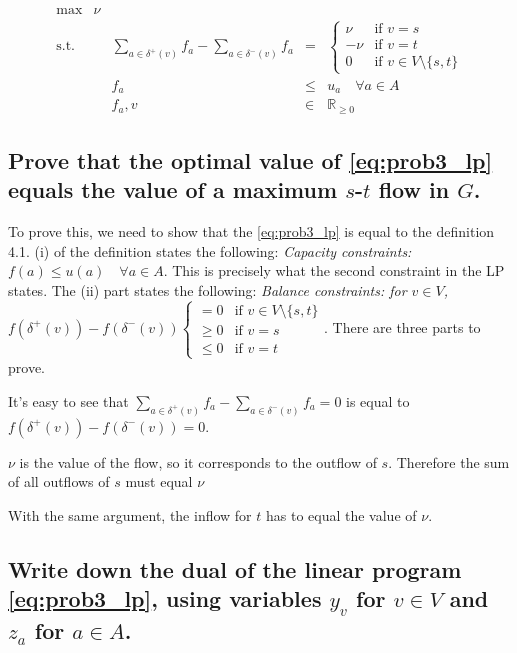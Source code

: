 \documentclass[12pt, a4]{article}
\begin{document}
\begin{equation}
	\begin{array}{llrcl}
		\max & \nu \\
		\text{s.t.} && \sum_{a\in\delta^+(v)}f_a - \sum_{a\in\delta^-(v)}f_a & = & \begin{cases}
			\nu &\text{if } v=s \\
			-\nu & \text{if } v=t \\
			0 & \text{if } v\in V \setminus \{s,t\}
			\end{cases} \\
		&& f_a & \leq & u_a \quad \forall a \in A \\
		&& f_a, v & \in & \mathbb{R}_{\geq 0}
	\end{array}
\label{eq:prob3_lp}
\end{equation}
\subsection{Prove that the optimal value of \autoref{eq:prob3_lp} equals the value of a maximum $s$-$t$ flow in $G$.}
To prove this, we need to show that the \autoref{eq:prob3_lp} is equal to the definition 4.1. (i) of the definition states the following: \textit{Capacity constraints: $f(a) \leq u(a) \quad \forall a \in A$}. This is precisely what the second constraint in the LP states. The (ii) part states the following: \textit{Balance constraints: for $v\in V$, $f(\delta^+(v)) - f(\delta^-(v)) \begin{cases}
=0 & \text{if } v \in V \setminus \{s,t\} \\
\geq 0 & \text{if } v = s \\
\leq 0 & \text{if } v = t
\end{cases}$}. There are three parts to prove. 

It's easy to see that $\sum_{a\in\delta^+(v)}f_a - \sum_{a\in\delta^-(v)}f_a = 0$ is equal to $f(\delta^+(v)) - f(\delta^-(v)) = 0$. 

$\nu$ is the value of the flow, so it corresponds to the outflow of $s$. Therefore the sum of all outflows of $s$ must equal $\nu$

With the same argument, the inflow for $t$ has to equal the value of $\nu$.

\subsection{Write down the dual of the linear program \autoref{eq:prob3_lp}, using variables $y_v$ for $v\in V$ and $z_a$ for $a\in A$.}
\end{document}
